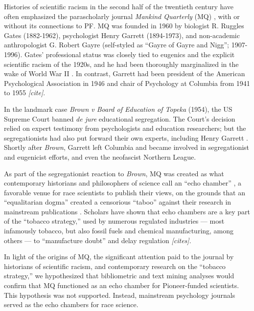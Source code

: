 \documentclass[12pt]{article}
\begin{document}
Histories of scientific racism in the second half of the twentieth century have often emphasized the parascholarly journal \emph{Mankind Quarterly} (MQ) \cite{
MehlerFoundationFascismNew1989,
WinstonScienceServiceFar1998,
SchafferScientificRacismAgain2007,
SainiSuperiorReturnRace2019,
WinstonScientificRacismNorth2020,
AdamsMisAppropriationBiological2021,
SainiDraperMillionsPhilanthropic2022
}, with or without its connections to PF. MQ was founded in 1960 by biologist R. Ruggles Gates (1882-1962), psychologist Henry Garrett (1894-1973), and non-academic anthropologist G. Robert Gayre (self-styled as ``Gayre of Gayre and Nigg''; 1907-1996). Gates' professional status was closely tied to eugenics and the explicit scientific racism of the 1920s, and he had been thoroughly marginalized in the wake of World War II \cite{WinstonScienceServiceFar1998}. In contrast, Garrett had been president of the American Psychological Association in 1946 and chair of Psychology at Columbia from 1941 to 1955 \emph{{[}cite{]}}.

In the landmark case \emph{Brown v Board of Education of Topeka} (1954), the US Supreme Court banned \emph{de jure} educational segregation. The Court's decision relied on expert testimony from psychologists and education researchers; but the segregationists had also put forward their own experts, including Henry Garrett \cite{WinstonScienceServiceFar1998, JacksonScienceSegregationRace2005, SchafferScientificRacismAgain2007}. Shortly after \emph{Brown}, Garrett left Columbia and became involved in segregationist and eugenicist efforts, and even the neofascist Northern League.

As part of the segregationist reaction to \emph{Brown}, MQ was created as what contemporary historians and philosophers of science call an ``echo chamber'' \cite{FernandezPintoKnowBetterNot2017}, a favorable venue for race scientists to publish their views, on the grounds that an ``equalitarian dogma'' created a censorious ``taboo'' against their research in mainstream publications \cite{TuckerFundingScientificRacism2002, JacksonMythicalTabooRace2020}. Scholars have shown that echo chambers are a key part of the ``tobacco strategy,'' used by numerous regulated industries --- most infamously tobacco, but also fossil fuels and chemical manufacturing, among others --- to ``manufacture doubt'' and delay regulation \emph{{[}cites{]}}.

In light of the origins of MQ, the significant attention paid to the journal by historians of scientific racism, and contemporary research on the ``tobacco strategy,'' we hypothesized that bibliometric and text mining analyses would confirm that MQ functioned as an echo chamber for Pioneer-funded scientists. This hypothesis was not supported. Instead, mainstream psychology journals served as the echo chambers for race science.
\end{document}
